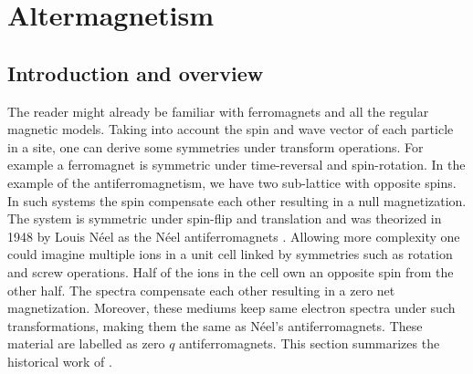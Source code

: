 \documentclass[../main.tex]{main.tex}
\begin{document}
\section{Altermagnetism}
\subsection{Introduction and overview}
The reader might already be familiar with ferromagnets and all the regular magnetic models. Taking into account the spin and
wave vector of each particle in a site, one can derive some symmetries under transform operations. For example a
ferromagnet is symmetric under time-reversal and spin-rotation. In the example of the antiferromagnetism,
we have two sub-lattice with opposite spins. In such systems the spin compensate each other resulting in a null magnetization.
The system is symmetric under spin-flip and translation and was theorized in 1948 by Louis Néel as the Néel antiferromagnets \cite{Neel1936}.
Allowing more complexity one could imagine multiple ions in a unit cell linked by symmetries such as rotation and screw operations. Half of the ions in the cell
own an opposite spin from the other half. The spectra compensate each other resulting in a zero net magnetization.
Moreover, these mediums keep same electron spectra under such transformations, making them the same as Néel's antiferromagnets.
These material are labelled as zero $q$ antiferromagnets.
This section summarizes the historical work of \cite{Mazin2024}.\\
\end{document}
